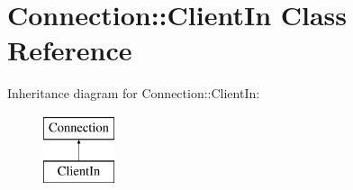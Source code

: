 \hypertarget{class_d_jabberd_1_1_connection_1_1_client_in}{
\section{\-Connection\-:\-:\-Client\-In \-Class \-Reference}
\label{class_d_jabberd_1_1_connection_1_1_client_in}
}
\-Inheritance diagram for \-Connection\-:\-:\-Client\-In\-:\begin{figure}[H]
\begin{center}
\leavevmode
\includegraphics[height=2.000000cm]{class_d_jabberd_1_1_connection_1_1_client_in}
\end{center}
\end{figure}
